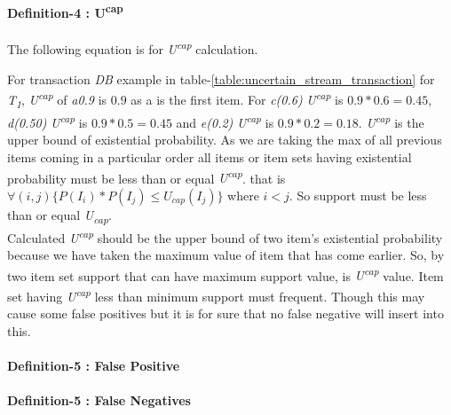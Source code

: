     \paragraph{Definition-4 : U\textsuperscript{cap}} 
    The following equation is for \emph{U\textsuperscript{cap}}    calculation.
    
    For transaction \emph{DB} example in table-\ref{table:uncertain_stream_transaction} for \emph{T\textsubscript{1}}, \emph{U\textsuperscript{cap}} of \emph{a{0.9}} is $0.9$ as a is the first item. For \emph{c(0.6)} \emph{U\textsuperscript{cap}} is $0.9*0.6=0.45$, \emph{d(0.50)} \emph{U\textsuperscript{cap}} is $0.9*0.5=0.45$ and \emph{e(0.2)} \emph{U\textsuperscript{cap}} is $0.9*0.2=0.18$. \emph{U\textsuperscript{cap}} is the upper bound of existential probability. As we are taking the max of all previous items coming in a particular order all items or item sets having existential probability must be less than or equal \emph{U\textsuperscript{cap}}. that is $\forall(i,j)\{ P(I_i)*P(I_j)\leq U_{cap}(I_j)\}$ where $i < j$. So support must be less than or equal \emph{U\textsubscript{cap}}.\\
    Calculated \emph{U\textsuperscript{cap}} should be the upper bound of two item's existential probability because we have taken the maximum value of item that has come earlier. So, by two item set support that can have maximum support value, is \emph{U\textsuperscript{cap}} value. Item set having \emph{U\textsuperscript{cap}} less than minimum support must frequent. Though this may cause some false positives but it is for sure that no false negative will insert into this. 
    
    \paragraph{Definition-5 : False Positive}
    \paragraph{Definition-5 : False Negatives}
    
